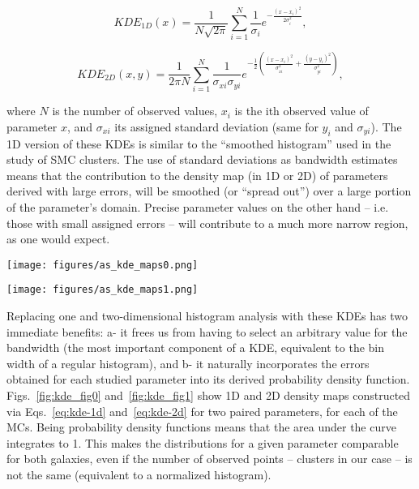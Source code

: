 \documentclass[a4paper,fleqn,usenatbib]{mnras}
\begin{document}
\begin{equation}
KDE_{1D}(x) = \frac{1}{N\sqrt{2\pi}} \sum_{i=1}^N \frac{1}{\sigma_i}
e^{-\frac{(x-x_i)^2}{2\sigma_i^2}},
\label{eq:kde-1d}
\end{equation}

\begin{equation}
KDE_{2D}(x,y) = \frac{1}{2\pi N} \sum_{i=1}^N \frac{1}{\sigma_{xi}\sigma_{yi}}
e^{-\frac{1}{2} \left( \frac{(x-x_i)^2}{\sigma_{xi}^2} + 
\frac{(y-y_i)^2}{\sigma_{yi}^2} \right)},
\label{eq:kde-2d}
\end{equation}

\noindent where $N$ is the number of observed values, $x_i$ is the ith observed
value of parameter $x$, and $\sigma_{xi}$ its assigned standard deviation (same
for $y_i$ and $\sigma_{yi}$). The 1D version of these KDEs is similar to the
``smoothed histogram'' used in the~\cite{Rafelski_2005} study of SMC clusters.
%
The use of standard deviations as bandwidth estimates means that the
contribution to the density map (in 1D or 2D) of parameters derived with large
errors, will be smoothed (or ``spread out'') over a large portion of the
parameter's domain. Precise parameter values on the other hand -- i.e. those
with small assigned errors -- will contribute to a much more narrow region, as
one would expect.

\begin{figure*}
\texttt{[image: figures/as\_kde\_maps0.png]}
\caption{One and two-dimensional Gaussian adaptive KDEs for the age, metallicity
and mass parameters. Top and right plots are 1D KDEs while the centre plots are
2D KDEs.
Observed clusters are plotted as red and blue stars for the S/LMC,
respectively in the 2D KDEs. Sizes are scaled according to each OC's radius in
parsecs. A small scatter is introduced for clarity.}
\label{fig:kde_fig0}
\end{figure*}

\begin{figure*}
\texttt{[image: figures/as\_kde\_maps1.png]}
\caption{Same as Fig.~\ref{fig:kde_fig0} for the extinction and distance
modulus parameters.}
\label{fig:kde_fig1}
\end{figure*}

Replacing one and two-dimensional histogram analysis with these KDEs has two
immediate benefits: a- it frees us from having to select an
arbitrary value for the bandwidth (the most important component of a KDE,
equivalent to the bin width of a regular histogram), and b- it naturally
incorporates the errors obtained for each studied parameter into its derived
probability density function.
Figs.~\ref{fig:kde_fig0} and~\ref{fig:kde_fig1} show 1D and 2D density maps
constructed via Eqs.~\ref{eq:kde-1d} and~\ref{eq:kde-2d} for two paired
parameters, for each of the MCs.\@
%
Being probability density functions means that the area under the curve
integrates to 1. This makes the distributions for a given parameter comparable
for both galaxies, even if the number of observed points -- clusters in our case
-- is not the same (equivalent to a normalized histogram).
%
\end{document}
